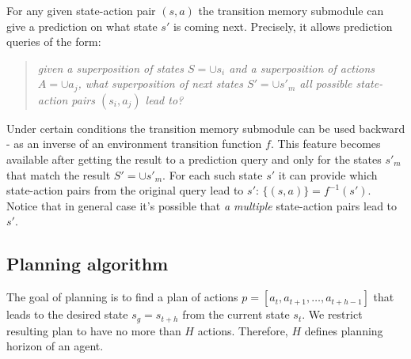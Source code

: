 \documentclass[a4paper,twoside]{article}
\begin{document}
For any given state-action pair $(s, a)$ the transition memory submodule can give a prediction on what state $s'$ is coming next.
Precisely, it allows prediction queries of the form:

\begin{quote}
  \textit{given a superposition \footnotemark of states $S = \cup s_i$ and a superposition of actions $A = \cup a_j$, what superposition of next states $S'= \cup s'_m$ all possible state-action pairs $(s_i, a_j)$ lead to?}
\end{quote}



Under certain conditions the transition memory submodule can be used backward - as an inverse of an environment transition function $f$. This feature becomes available after getting the result to a prediction query and only for the states $s'_m$ that match the result $S' = \cup s'_m$. For each such state $s'$ it can provide which state-action pairs from the original query lead to $s'$: $\{(s, a)\} = f^{-1}(s')$. Notice that in general case it's possible that \textit{a multiple} state-action pairs lead to $s'$.

\subsection{Planning algorithm}

The goal of planning is to find a plan of actions $p = [a_t, a_{t+1}, \dots, a_{t+h-1}]$ that leads to the desired state $s_g = s_{t+h}$ from the current state $s_t$. We restrict resulting plan to have no more than $H$ actions. Therefore, $H$ defines planning horizon of an agent.
\end{document}
